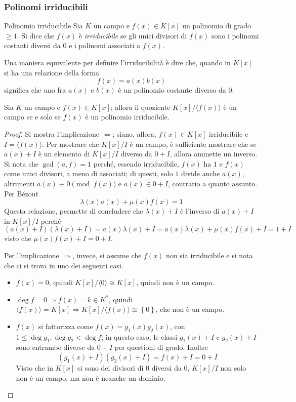 \documentclass[11pt, a4paper]{scrartcl}
\theoremstyle{definition}
\numberwithin{esempio}{section}
\theoremstyle{definition}
\numberwithin{obs}{section}
\numberwithin{nota}{section}
\numberwithin{equation}{subsection}
\begin{document}
\subsubsection{Polinomi irriducibili}
\begin{definizione}
	{Polinomio irriducibile}{}
	Sia $K$ un campo e $f(x) \in K[x]$ un polinomio di grado $\ge 1$. Si dice che $f(x)$ \`e \textit{irriducibile} se gli unici divisori di $f(x)$ sono i polinomi costanti diversi da $0$ e i polinomi associati a $f(x)$.
\end{definizione}
\noindent Una maniera equivalente per definire l'irriducibilit\`a \`e dire che, quando in $K[x]$ si ha una relazione della forma
\[
f(x) = a(x) b(x)
\] 
significa che uno fra $a(x)$ e $b(x)$ \`e un polinomio costante diverso da $0$.
\begin{teorema}
	{}{}
	Sia $K$ un campo e $f(x) \in K[x]$; allora il quoziente $K[x] / \langle f(x) \rangle$ \`e un campo se e solo se $f(x)$ \`e un polinomio irriducibile.
	\begin{proof}
		Si mostra l'implicazione $\Leftarrow $; siano, allora, $f(x) \in K[x]$ irriducibile e $I = \langle f(x) \rangle$.
		Per mostrare che $K[x] / I$ \`e un campo, \`e sufficiente mostrare che se $a(x) + I$ \`e un elemento di $K[x] / I$ diverso da $0 + I$, allora ammette un inverso.
		Si nota che $\operatorname{gcd}(a,f) =1$ perch\'e, essendo irriducibile, $f(x)$ ha $1$ e $f(x)$ come unici divisori, a meno di associati; di questi, solo $1$ divide anche $a(x)$, altrimenti $a(x) \equiv 0 \pmod{ f(x) } $ e $a(x) \in 0 + I$, contrario a quanto assunto.
		Per B\'ezout
		\[
		\lambda (x)a(x) + \mu (x) f(x) = 1
		\] 
		Questa relazione, permette di concludere che $\lambda (x) + I$ \`e l'inverso di $a(x) + I$ in $K[x] / I$ perch\'e
		\[
			(a(x) + I ) (\lambda (x) + I ) = a(x) \lambda (x) + I = a(x) \lambda (x) + \mu (x) f(x) + I = 1 + I
		\] 
		visto che $\mu (x) f(x) + I = 0 + I$.

		Per l'implicazione $\Rightarrow $, invece, si assume che $f(x)$ non sia irriducibile e si nota che ci si trova in uno dei seguenti casi.
		\begin{itemize}
			\item  $f(x) = 0$, quindi $K[x] / \langle 0 \rangle \cong K[x]$, quindi non \`e un campo.
			\item $\operatorname{deg} f = 0 \Rightarrow  f(x) = k \in K^*$, quindi $\langle f(x) \rangle= K[x] \Rightarrow K[x] / \langle f(x) \rangle\cong \left\{ 0 \right\} $, che non \`e un campo.
			\item $f(x)$ si fattorizza come $f(x)=g_1(x)g_2(x)$, con $1\le \operatorname{deg} g_1,\operatorname{deg} g_2 < \operatorname{deg} f$; in questo caso, le classi $g_1(x) + I$ e $g_2(x) + I$ sono entrambe diverse da $0+I$ per questioni di grado.
				Inoltre
				\[
					(g_1(x) + I ) (g_2(x) + I) = f(x) + I = 0 + I
				\] 
				Visto che in $K[x]$ ci sono dei divisori di $0$ diversi da $0$, $K[x] / I$ non solo non \`e un campo, ma non \`e neanche un dominio.
		\end{itemize}
	\end{proof}
\end{teorema}
\end{document}
